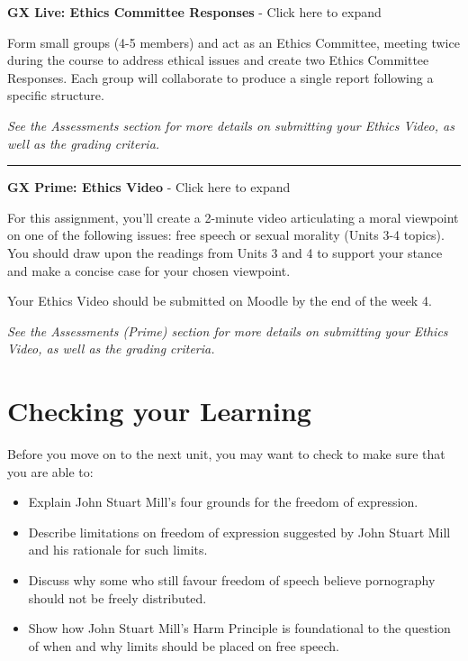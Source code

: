 \documentclass[
]{book}
\providecommand{\tightlist}{%
  \setlength{\itemsep}{0pt}\setlength{\parskip}{0pt}}
\begin{document}
\begin{assessment}
\textbf{GX Live: Ethics Committee Responses} - Click here to expand

Form small groups (4-5 members) and act as an Ethics Committee, meeting twice during the course to address ethical issues and create two Ethics Committee Responses. Each group will collaborate to produce a single report following a specific structure.

\emph{See the Assessments section for more details on submitting your Ethics Video, as well as the grading criteria.}

\begin{center}\rule{0.5\linewidth}{0.5pt}\end{center}

\textbf{GX Prime: Ethics Video} - Click here to expand

For this assignment, you'll create a 2-minute video articulating a moral viewpoint on one of the following issues: free speech or sexual morality (Units 3-4 topics). You should draw upon the readings from Units 3 and 4 to support your stance and make a concise case for your chosen viewpoint.

Your Ethics Video should be submitted on Moodle by the end of the week 4.

\emph{See the Assessments (Prime) section for more details on submitting your Ethics Video, as well as the grading criteria.}
\end{assessment}

\hypertarget{checking-your-learning-2}{%
\section*{Checking your Learning}\label{checking-your-learning-2}}

\begin{progress}
Before you move on to the next unit, you may want to check to make sure that you are able to:

\begin{itemize}
\tightlist
\item
  Explain John Stuart Mill's four grounds for the freedom of expression.
\item
  Describe limitations on freedom of expression suggested by John Stuart Mill and his rationale for such limits.
\item
  Discuss why some who still favour freedom of speech believe pornography should not be freely distributed.
\item
  Show how John Stuart Mill's Harm Principle is foundational to the question of when and why limits should be placed on free speech.
\end{itemize}
\end{progress}
\end{document}
